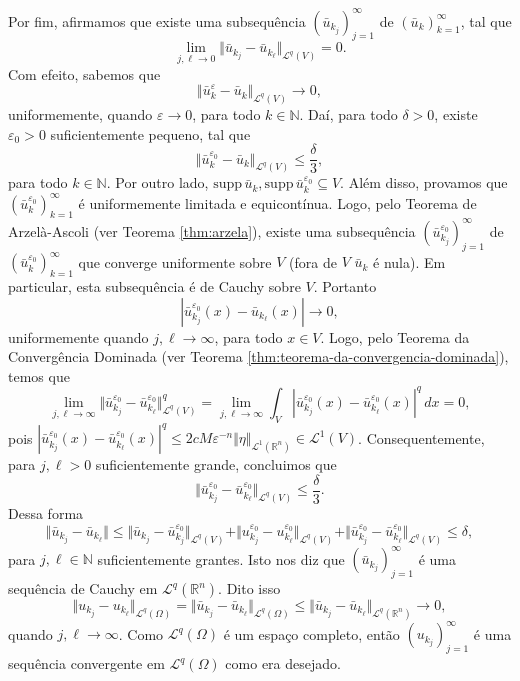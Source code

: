 \documentclass[a4paper, 11pt]{book}
\theoremstyle{definition}
\newcommand{\bN}{\mathbb{N}}
\newcommand{\bR}{\mathbb{R}}
\newcommand{\cL}{\mathcal{L}}
\newcommand{\supp}{\mathrm{supp}\,}
\begin{document}
\begin{prf}
    Por fim, afirmamos que existe uma subsequência $(\bar u_{k_j})_{j=1}^\infty$ de $(\bar u_k)_{k=1}^\infty$, tal que
    \[
        \lim_{j,\ell \to 0} \Vert \bar u_{k_j} - \bar u_{k_\ell} \Vert_{\cL^q(V)} = 0.
    \]
    Com efeito, sabemos que
    \[
        \Vert \bar u_k^\varepsilon - \bar u_k \Vert_{\cL^q(V)} \to 0,
    \]
    uniformemente, quando $\varepsilon \to 0$, para todo $k \in \bN$.
    Daí, para todo $\delta > 0$, existe $\varepsilon_0 > 0$ suficientemente pequeno, tal que
    \[
        \Vert \bar u_k^{\varepsilon_0} - \bar u_k \Vert_{\cL^q(V)} \leqslant \frac{\delta}{3},
    \]
    para todo $k \in \bN$.
    Por outro lado, $\supp \bar u_k, \supp \bar u_k^{\varepsilon_0} \subseteq V$. Além disso, provamos que $(\bar u_k^{\varepsilon_0})_{k=1}^\infty$ é uniformemente limitada e equicontínua.
    Logo, pelo Teorema de Arzelà-Ascoli (ver Teorema \ref{thm:arzela}), existe uma subsequência $(\bar u_{k_j}^{\varepsilon_0})_{j=1}^\infty$ de $(\bar u_k^{\varepsilon_0})_{k=1}^\infty$ que converge uniformente sobre $V$ (fora de $V$ $\bar u_k$ é nula). Em particular, esta subsequência é de Cauchy sobre $V$.
    Portanto
    \[
        |\bar u_{k_j}^{\varepsilon_0}(x) - \bar u_{k_\ell}(x)| \to 0,
    \]
    uniformemente quando $j,\ell \to \infty$, para todo $x \in V$.
    Logo, pelo Teorema da Convergência Dominada (ver Teorema \ref{thm:teorema-da-convergencia-dominada}), temos que
    \[
        \lim_{j,\ell \to \infty} \Vert \bar u_{k_j}^{\varepsilon_0} - \bar u_{k_\ell}^{\varepsilon_0} \Vert_{\cL^q(V)}^q = \lim_{j,\ell \to \infty} \int_V | \bar u_{k_j}^{\varepsilon_0}(x) - \bar u_{k_\ell}^{\varepsilon_0}(x)|^q \,dx = 0,
    \]
    pois $| \bar u_{k_j}^{\varepsilon_0}(x) - \bar u_{k_\ell}^{\varepsilon_0}(x)|^q \leqslant 2 cM \varepsilon^{-n} \Vert \eta \Vert_{\cL^1(\bR^n)} \in \cL^1(V)$.
    Consequentemente, para $j,\ell > 0$ suficientemente grande, concluimos que
    \[
        \Vert \bar u_{k_j}^{\varepsilon_0} - \bar u_{k_\ell}^{\varepsilon_0} \Vert_{\cL^q(V)} \leqslant \frac{\delta}{3}.
    \]
    Dessa forma
    \[
        \Vert \bar u_{k_j} - \bar u_{k_\ell} \Vert \leqslant \Vert \bar u_{k_j} - \bar u_{k_j}^{\varepsilon_0} \Vert_{\cL^q(V)} + \Vert u_{k_j}^{\varepsilon_0} - u_{k_\ell}^{\varepsilon_0} \Vert_{\cL^q(V)} + \Vert \bar u_{k_j}^{\varepsilon_0} - \bar u_{k_\ell}^{\varepsilon_0} \Vert_{\cL^q(V)} \leqslant \delta,
    \]
    para $j, \ell \in \bN$ suficientemente grantes.
    Isto nos diz que $(\bar u_{k_j})_{j=1}^\infty$ é uma sequência de Cauchy em $\cL^q(\bR^n)$.
    Dito isso
    \[
        \Vert u_{k_j} - u_{k_\ell} \Vert_{\cL^q(\Omega)} = \Vert \bar u_{k_j} - \bar u_{k_\ell} \Vert_{\cL^q(\Omega)} \leqslant \Vert \bar u_{k_j} - \bar u_{k_\ell} \Vert_{\cL^q(\bR^n)} \to 0,
    \]
    quando $j,\ell \to \infty$.
    Como $\cL^q(\Omega)$ é um espaço completo, então $(u_{k_j})_{j=1}^\infty$ é uma sequência convergente em $\cL^q(\Omega)$ como era desejado.
\end{prf}
\end{document}
